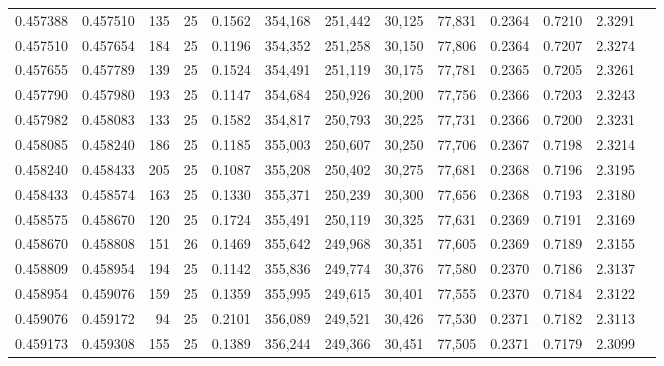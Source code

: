 \begin{tabular}{rrrrrrrrrrrrr}
0.457388 & 0.457510 &   135 &  25 &                                     0.1562 & 354,168 & 251,442 &  30,125 &  77,831 & 0.2364 & 0.7210 & 2.3291 \\
0.457510 & 0.457654 &   184 &  25 &                                     0.1196 & 354,352 & 251,258 &  30,150 &  77,806 & 0.2364 & 0.7207 & 2.3274 \\
0.457655 & 0.457789 &   139 &  25 &                                     0.1524 & 354,491 & 251,119 &  30,175 &  77,781 & 0.2365 & 0.7205 & 2.3261 \\
0.457790 & 0.457980 &   193 &  25 &                                     0.1147 & 354,684 & 250,926 &  30,200 &  77,756 & 0.2366 & 0.7203 & 2.3243 \\
0.457982 & 0.458083 &   133 &  25 &                                     0.1582 & 354,817 & 250,793 &  30,225 &  77,731 & 0.2366 & 0.7200 & 2.3231 \\
0.458085 & 0.458240 &   186 &  25 &                                     0.1185 & 355,003 & 250,607 &  30,250 &  77,706 & 0.2367 & 0.7198 & 2.3214 \\
0.458240 & 0.458433 &   205 &  25 &                                     0.1087 & 355,208 & 250,402 &  30,275 &  77,681 & 0.2368 & 0.7196 & 2.3195 \\
0.458433 & 0.458574 &   163 &  25 &                                     0.1330 & 355,371 & 250,239 &  30,300 &  77,656 & 0.2368 & 0.7193 & 2.3180 \\
0.458575 & 0.458670 &   120 &  25 &                                     0.1724 & 355,491 & 250,119 &  30,325 &  77,631 & 0.2369 & 0.7191 & 2.3169 \\
0.458670 & 0.458808 &   151 &  26 &                                     0.1469 & 355,642 & 249,968 &  30,351 &  77,605 & 0.2369 & 0.7189 & 2.3155 \\
0.458809 & 0.458954 &   194 &  25 &                                     0.1142 & 355,836 & 249,774 &  30,376 &  77,580 & 0.2370 & 0.7186 & 2.3137 \\
0.458954 & 0.459076 &   159 &  25 &                                     0.1359 & 355,995 & 249,615 &  30,401 &  77,555 & 0.2370 & 0.7184 & 2.3122 \\
0.459076 & 0.459172 &    94 &  25 &                                     0.2101 & 356,089 & 249,521 &  30,426 &  77,530 & 0.2371 & 0.7182 & 2.3113 \\
0.459173 & 0.459308 &   155 &  25 &                                     0.1389 & 356,244 & 249,366 &  30,451 &  77,505 & 0.2371 & 0.7179 & 2.3099 \\

\end{tabular}
